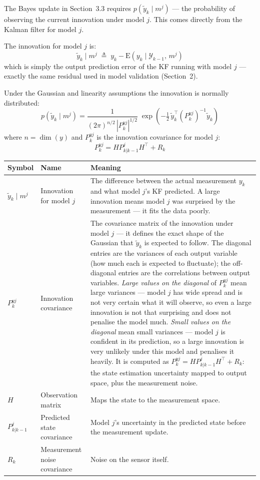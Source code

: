 \documentclass[12pt, a4paper]{article}
\begin{document}
The Bayes update in Section~3.3 requires $p(\tilde{y}_k \mid m^j)$ ---
the probability of observing the current innovation under model $j$.
This comes directly from the Kalman filter for model $j$.

The innovation for model $j$ is:
\[
  \tilde{y}_k \mid m^j
  \;\triangleq\; y_k - \mathrm{E}(y_k \mid \mathcal{Y}_{k-1},\, m^j)
\]
which is simply the output prediction error of the KF running with model
$j$ --- exactly the same residual used in model validation (Section~2).

Under the Gaussian and linearity assumptions the innovation is normally
distributed:
\[
  p(\tilde{y}_k \mid m^j)
  = \frac{1}{(2\pi)^{n/2}\,|P_k^{yj}|^{1/2}}\;
    \exp\!\left(-\tfrac{1}{2}\,
      \tilde{y}_k^\top (P_k^{yj})^{-1} \tilde{y}_k
    \right)
\]
where $n = \dim(y)$ and $P_k^{yj}$ is the innovation covariance for
model $j$:
\[
  P_k^{yj} = H P_{k|k-1}^j H^\top + R_k
\]

\begin{center}
\begin{tabular}{@{} l p{3.0cm} p{7.4cm} @{}}
  \toprule
  Symbol & Name & Meaning \\
  \midrule
  $\tilde{y}_k \mid m^j$ & Innovation for model $j$ &
    The difference between the actual measurement $y_k$ and what model
    $j$'s KF predicted.
    A large innovation means model $j$ was surprised by the measurement
    --- it fits the data poorly. \\
  $P_k^{yj}$ & Innovation covariance &
    The covariance matrix of the innovation under model $j$ --- it
    defines the exact shape of the Gaussian that $\tilde{y}_k$ is
    expected to follow.
    The diagonal entries are the variances of each output variable
    (how much each is expected to fluctuate); the off-diagonal entries
    are the correlations between output variables.
    \emph{Large values on the diagonal} of $P_k^{yj}$ mean large
    variances --- model $j$ has wide spread and is not very certain what
    it will observe, so even a large innovation is not that surprising
    and does not penalise the model much.
    \emph{Small values on the diagonal} mean small variances --- model
    $j$ is confident in its prediction, so a large innovation is very
    unlikely under this model and penalises it heavily.
    It is computed as $P_k^{yj} = HP_{k|k-1}^j H^\top + R_k$: the
    state estimation uncertainty mapped to output space, plus the
    measurement noise. \\
  $H$ & Observation matrix & Maps the state to the measurement space. \\
  $P_{k|k-1}^j$ & Predicted state covariance &
    Model $j$'s uncertainty in the predicted state before the measurement
    update. \\
  $R_k$ & Measurement noise covariance & Noise on the sensor itself. \\
  \bottomrule
\end{tabular}
\end{center}
\end{document}
